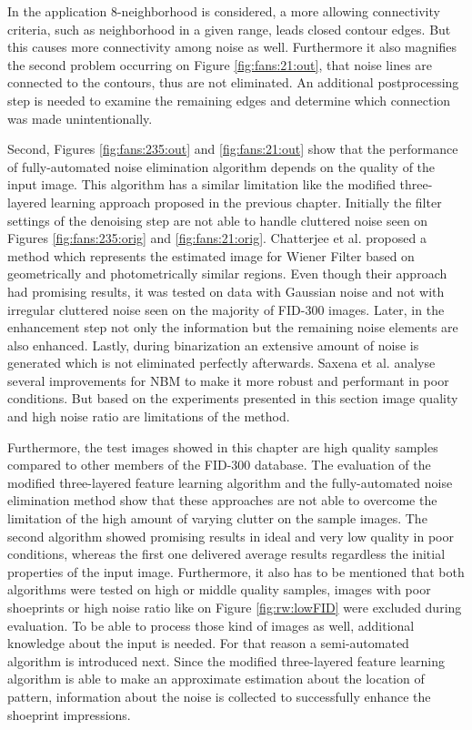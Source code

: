 \documentclass[draft,final]{vutinfth} %
\begin{document}
In the application 8-neighborhood is considered, a more allowing connectivity criteria, such as neighborhood in a given range, leads closed contour edges.
But this causes more connectivity among noise as well.
Furthermore it also magnifies the second problem occurring on Figure \ref{fig:fans:21:out}, that noise lines are connected to the contours, thus are not eliminated.
An additional postprocessing step is needed to examine the remaining edges and determine which connection was made unintentionally.
\par
Second, Figures \ref{fig:fans:235:out} and \ref{fig:fans:21:out} show that the performance of fully-automated noise elimination algorithm depends on the quality of the input image.
This algorithm has a similar limitation like the modified three-layered learning approach proposed in the previous chapter.
Initially the filter settings of the denoising step are not able to handle cluttered noise seen on Figures \ref{fig:fans:235:orig} and \ref{fig:fans:21:orig}.
Chatterjee et al. \cite{chatterjee2011patch} proposed a method which represents the estimated image for Wiener Filter based on geometrically and photometrically similar regions.
Even though their approach had promising results, it was tested on data with Gaussian noise and not with irregular cluttered noise seen on the majority of FID-300 images.
Later, in the enhancement step not only the information but the remaining noise elements are also enhanced.
Lastly, during binarization an extensive amount of noise is generated which is  not eliminated perfectly afterwards.
Saxena et al. \cite{saxena2019niblack} analyse several improvements for NBM to make it more robust and performant in poor conditions.
But based on the experiments presented in this section image quality and high noise ratio are limitations of the method.

\par
Furthermore, the test images showed in this chapter are high quality samples compared to other members of the FID-300 database.
The evaluation of the modified three-layered feature learning algorithm and the fully-automated noise elimination method show that these approaches are not able to overcome the limitation of the high amount of varying clutter on the sample images.
The second algorithm showed promising results in ideal and very low quality in poor conditions, whereas the first one delivered average results regardless the initial properties of the input image.
Furthermore, it also has to be mentioned that both algorithms were tested on high or middle quality samples, images with poor shoeprints or high noise ratio like on Figure \ref{fig:rw:lowFID} were excluded during evaluation.
To be able to process those kind of images as well, additional knowledge about the input is needed.
For that reason a semi-automated algorithm is introduced next.
Since the modified three-layered feature learning algorithm is able to make an approximate estimation about the location of pattern, information about the noise is collected to successfully enhance the shoeprint impressions.
\end{document}
